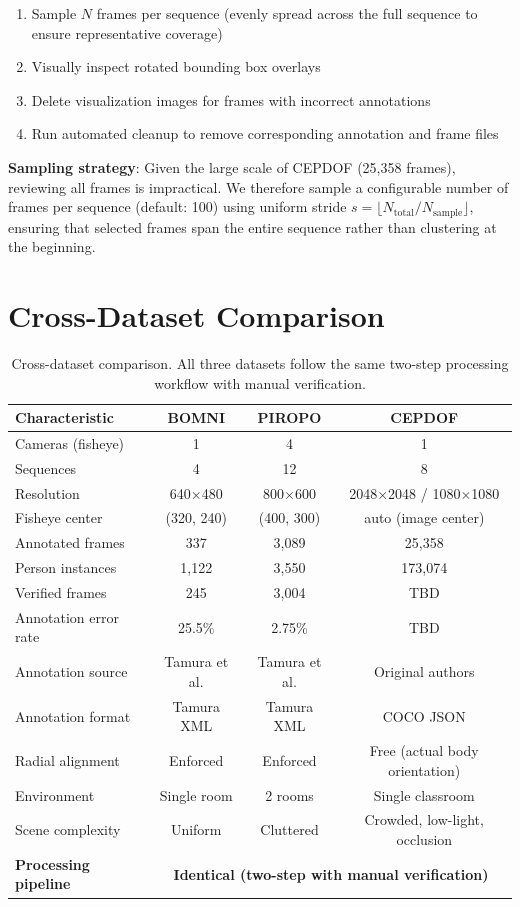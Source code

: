 \documentclass[11pt]{article}
\begin{document}
\begin{enumerate}[leftmargin=*]
    \item Sample $N$ frames per sequence (evenly spread across the full sequence to ensure representative coverage)
    \item Visually inspect rotated bounding box overlays
    \item Delete visualization images for frames with incorrect annotations
    \item Run automated cleanup to remove corresponding annotation and frame files
\end{enumerate}

\textbf{Sampling strategy}: Given the large scale of CEPDOF (25,358 frames), reviewing all frames is impractical. We therefore sample a configurable number of frames per sequence (default: 100) using uniform stride $s = \lfloor N_{\text{total}} / N_{\text{sample}} \rfloor$, ensuring that selected frames span the entire sequence rather than clustering at the beginning.

\section{Cross-Dataset Comparison}

\begin{table}[h]
\centering
\begin{tabular}{@{}lccc@{}}
\toprule
\textbf{Characteristic} & \textbf{BOMNI} & \textbf{PIROPO} & \textbf{CEPDOF} \\
\midrule
Cameras (fisheye) & 1 & 4 & 1 \\
Sequences & 4 & 12 & 8 \\
Resolution & 640$\times$480 & 800$\times$600 & 2048$\times$2048 / 1080$\times$1080 \\
Fisheye center & (320, 240) & (400, 300) & auto (image center) \\
Annotated frames & 337 & 3,089 & 25,358 \\
Person instances & 1,122 & 3,550 & 173,074 \\
Verified frames & 245 & 3,004 & TBD \\
Annotation error rate & 25.5\% & 2.75\% & TBD \\
Annotation source & Tamura et al. & Tamura et al. & Original authors \\
Annotation format & Tamura XML & Tamura XML & COCO JSON \\
Radial alignment & Enforced & Enforced & Free (actual body orientation) \\
Environment & Single room & 2 rooms & Single classroom \\
Scene complexity & Uniform & Cluttered & Crowded, low-light, occlusion \\
\midrule
\textbf{Processing pipeline} & \multicolumn{3}{c}{\textbf{Identical (two-step with manual verification)}} \\
\bottomrule
\end{tabular}
\caption{Cross-dataset comparison. All three datasets follow the same two-step processing workflow with manual verification.}
\end{table}
\end{document}
